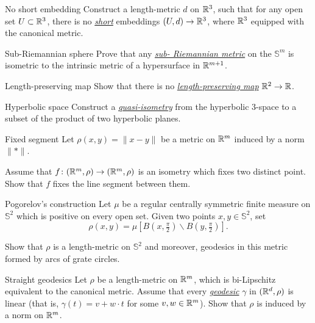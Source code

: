 \documentclass[twoside]{book}
\begin{document}
{\begin{pr}{\hard}{No short embedding}\label{weird-metric} 
Construct a length-metric $d$ on $\mathbb{R}^3$,
such that for any open set $U\subset  \mathbb{R}^3$,
there is no \hyperref[Short map]{\emph{short}} embeddings $(U,d)\to \mathbb{R}^3$,
where $\mathbb{R}^3$ equipped with the canonical metric.
\end{pr}

\begin{pr}{\thm}{Sub-Riemannian sphere}\label{sub-Riemannian} 
Prove that any \hyperref[Sub-Riemannian metric]{\emph{sub-\hskip0mm Riemannian metric}} 
on the $\mathbb{S}^m$ is isometric to the intrinsic metric of a hypersurface in $\mathbb{R}^{m+1}$.
\end{pr}

\begin{pr}{\thm}{Length-preserving map}\label{two2one} 
Show that there is no \hyperref[Length-preserving map]{\emph{length-preserving map}} $\mathbb{R}^2\to \mathbb{R}$.
\end{pr}



\begin{pr}{}{Hyperbolic space}\label{Hyperbolic space}
Construct a \hyperref[Quasi-isometry]{\emph{quasi-isometry}}
from the hyperbolic $3$-space 
to a subset 
of the product of two hyperbolic planes.
\end{pr}

\begin{pr}{}{Fixed segment}\label{Fixed segment}
Let $\rho(x,y)=\|x-y\|$ be a metric on $\mathbb{R}^m$ induced by a norm $\|{*}\|$.

Assume that $f\colon(\mathbb{R}^m,\rho)\to(\mathbb{R}^m,\rho)$ is an isometry which fixes two distinct point.
Show that $f$ fixes the line segment between them.
\end{pr}

\begin{pr}{}{Pogorelov's construction}\label{Pogorelov's construction}
Let $\mu$ be a regular centrally symmetric finite measure on $\mathbb{S}^2$ which is positive on every open set.
Given two points $x,y\in \mathbb{S}^2$,
set 
\[\rho(x,y)=\mu[B(x,\tfrac \pi2)\backslash B(y,\tfrac\pi2)].\]

Show that $\rho$ is a length-metric on $\mathbb{S}^2$
and moreover, geodesics in this metric formed by arcs of grate circles.
\end{pr}

\begin{pr}{}{Straight geodesics}\label{Straight geodesics}
Let $\rho$ be a length-metric on $\mathbb{R}^m$, 
which is bi-Lipschitz equivalent to the canonical metric.
Assume that every \hyperref[Geodesic]{\emph{ge\-o\-de\-sic}} $\gamma$ in $(\mathbb{R}^d,\rho)$ is linear 
(that is, $\gamma(t)=v+w\cdot t$ for some $v,w\in\mathbb{R}^m$).
Show that $\rho$ is induced by a norm on $\mathbb{R}^m$.
\end{pr}

}
\end{document}

